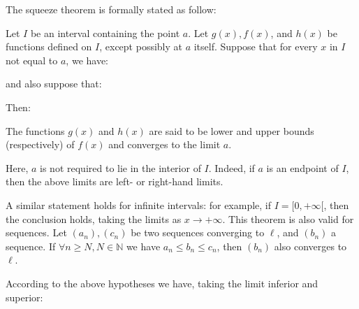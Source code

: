 	The squeeze theorem is formally stated as follow:
	\begin{theorem}
	Let $I$ be an interval containing the point $a$. Let $g(x), f(x)$, and $h(x)$ be functions defined on $I$, except possibly at $a$ itself. Suppose that for every $x$ in $I$ not equal to $a$, we have:
	
	and also suppose that:
	
	Then:
	
	\begin{figure}[H]
		\centering
	\end{figure}
	The functions $g(x)$ and $h(x)$ are said to be lower and upper bounds (respectively) of $f(x)$ and converges to the limit $a$.
	
	 Here, $a$ is not required to lie in the interior of $I$. Indeed, if $a$ is an endpoint of $I$, then the above limits are left- or right-hand limits.
	 
	 \begin{tcolorbox}[enhanced,title=Remark,colframe=black,arc=10pt,drop lifted shadow,after skip=15pt plus 2pt]
	A similar statement holds for infinite intervals: for example, if $I=[0, +\infty[$, then the conclusion holds, taking the limits as $x \rightarrow +\infty$. This theorem is also valid for sequences. Let $\left(a_n\right),\left(c_n\right)$ be two sequences converging to $\ell$, and $\left(b_n\right)$ a sequence. If $\forall n \geq N, N \in \mathbb{N}$ we have $a_n \leq b_n \leq c_n$, then $\left(b_n\right)$ also converges to $\ell$.
	\end{tcolorbox}
	
	
	\end{theorem}
	According to the above hypotheses we have, taking the limit inferior and superior:
	

